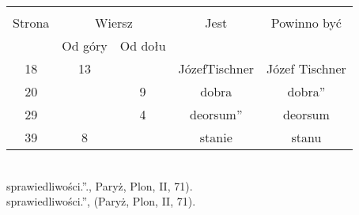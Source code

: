 \documentclass[a4paper,11pt]{article}
\begin{document}




\vspace{\spaceTwo} \vspace{\spaceThree}





\begin{center}
  \begin{tabular}{|c|c|c|c|c|}
    \hline
    & \multicolumn{2}{c|}{} & & \\
    Strona & \multicolumn{2}{c|}{Wiersz}& Jest & Powinno być \\ \cline{2-3}
    & Od góry & Od dołu &  &  \\ \hline
    18 & 13 & & JózefTischner & Józef Tischner \\
    20 & & 9 & dobra & dobra'' \\
    29 & & 4 & deorsum'' & deorsum \\
    39 & 8 & & stanie & stanu \\
    \hline
  \end{tabular}
\end{center}
\noi
{} \\
\Jest sprawiedliwości.''., Paryż, Plon, II, 71). \\
\Pow sprawiedliwości.'', (Paryż, Plon, II, 71). \\

\vspace{\spaceTwo}







%   
%
%
\end{document}
